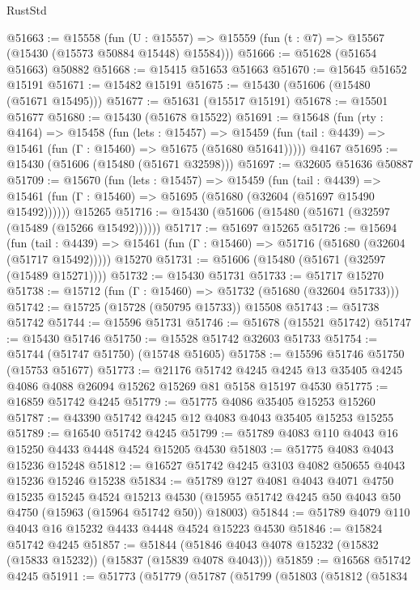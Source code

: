 \begin{lexlean}{RustStd}
\begin{coremodule}
@51663 := @15558
    (fun (U : @15557) => @15559 (fun (t : @7) => @15567 (@15430 (@15573 @50884 @15448) @15584)))
@51666 := @51628 (@51654 @51663) @50882
@51668 := @15415 @51653 @51663
@51670 := @15645 @51652 @15191
@51671 := @15482 @15191
@51675 := @15430 (@51606 (@15480 (@51671 @15495)))
@51677 := @51631 (@15517 @15191)
@51678 := @15501 @51677
@51680 := @15430 (@51678 @15522)
@51691 := @15648
    (fun (rty : @4164) =>
    @15458
      (fun (lets : @15457) =>
      @15459 (fun (tail : @4439) => @15461 (fun (Γ : @15460) => @51675 (@51680 @51641)))))
    @4167
@51695 := @15430 (@51606 (@15480 (@51671 @32598)))
@51697 := @32605 @51636 @50887
@51709 := @15670
    (fun (lets : @15457) =>
    @15459
      (fun (tail : @4439) =>
      @15461 (fun (Γ : @15460) => @51695 (@51680 (@32604 (@51697 @15490 @15492))))))
    @15265
@51716 := @15430 (@51606 (@15480 (@51671 (@32597 (@15489 (@15266 @15492))))))
@51717 := @51697 @15265
@51726 := @15694
    (fun (tail : @4439) => @15461 (fun (Γ : @15460) => @51716 (@51680 (@32604 (@51717 @15492)))))
    @15270
@51731 := @51606 (@15480 (@51671 (@32597 (@15489 @15271))))
@51732 := @15430 @51731
@51733 := @51717 @15270
@51738 := @15712 (fun (Γ : @15460) => @51732 (@51680 (@32604 @51733)))
@51742 := @15725 (@15728 (@50795 @15733)) @15508
@51743 := @51738 @51742
@51744 := @15596 @51731
@51746 := @51678 (@15521 @51742)
@51747 := @15430 @51746
@51750 := @15528 @51742 @32603 @51733
@51754 := @51744 (@51747 @51750) (@15748 @51605)
@51758 := @15596 @51746 @51750 (@15753 @51677)
@51773 := @21176
    @51742
    @4245
    @4245
    @13
    @35405
    @4245
    @4086
    @4088
    @26094
    @15262
    @15269
    @81
    @5158
    @15197
    @4530
@51775 := @16859 @51742 @4245
@51779 := @51775 @4086 @35405 @15253 @15260
@51787 := @43390 @51742 @4245 @12 @4083 @4043 @35405 @15253 @15255
@51789 := @16540 @51742 @4245
@51799 := @51789 @4083 @110 @4043 @16 @15250 @4433 @4448 @4524 @15205 @4530
@51803 := @51775 @4083 @4043 @15236 @15248
@51812 := @16527 @51742 @4245 @3103 @4082 @50655 @4043 @15236 @15246 @15238
@51834 := @51789
    @127
    @4081
    @4043
    @4071
    @4750
    @15235
    @15245
    @4524
    @15213
    @4530
    (@15955 @51742 @4245 @50 @4043 @50 @4750 (@15963 (@15964 @51742 @50)) @18003)
@51844 := @51789 @4079 @110 @4043 @16 @15232 @4433 @4448 @4524 @15223 @4530
@51846 := @15824 @51742 @4245
@51857 := @51844 (@51846 @4043 @4078 @15232 (@15832 (@15833 @15232)) (@15837 (@15839 @4078 @4043)))
@51859 := @16568 @51742 @4245
@51911 := @51773
    (@51779
      (@51787
        (@51799
          (@51803
            (@51812
              (@51834

\end{coremodule}
\end{lexlean}
